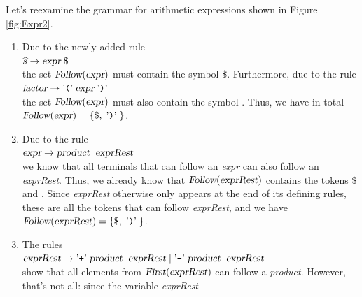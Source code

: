 \exampleEng
Let's reexamine the grammar for arithmetic expressions shown in Figure \ref{fig:Expr2}.
\begin{enumerate}
\item Due to the newly added rule
      \\[0.2cm]
      \hspace*{1.3cm}
      \(\widehat{s} \rightarrow \textsl{expr}\; \$\)
      \\[0.2cm]
      the set \(\textsl{Follow}(\textsl{expr})\) must contain the symbol \(\$\).
      Furthermore, due to the rule 
      \\[0.2cm]
      \hspace*{1.3cm}
      \(\textsl{factor} \rightarrow \mbox{'\texttt{(}'}\; \textsl{expr} \;\mbox{'\texttt{)}'}\)
      \\[0.2cm]
      the set \(\textsl{Follow}(\textsl{expr})\) must also contain the symbol \aquoted{)}.
      Thus, we have in total
      \\[0.2cm]
      \hspace*{1.3cm}
      \(\textsl{Follow}(\textsl{expr}) = \{ \$, \;\mbox{'\texttt{)}'}\; \}\).
\item Due to the rule 
      \\[0.2cm]
      \hspace*{1.3cm}
      \(\textsl{expr} \rightarrow \textsl{product}\;\;\textsl{exprRest}\)
      \\[0.2cm]      
      we know that all terminals that can follow an \textsl{expr} can also follow
      an \textsl{exprRest}. Thus, we already know that
      \(\textsl{Follow}(\textsl{exprRest})\) contains the tokens \(\$\) and \aquoted{)}.
      Since \textsl{exprRest} otherwise only appears at the end of its defining rules, these are all the tokens that can follow
      \textsl{exprRest}, and we have
      \\[0.2cm]
      \hspace*{1.3cm}
      \(\textsl{Follow}(\textsl{exprRest}) = \{ \$, \;\mbox{'\texttt{)}'}\; \}\).
\item The rules 
      \\[0.2cm]
      \hspace*{1.3cm}
      \(\textsl{exprRest} \rightarrow \mbox{'\texttt{+}'}\; \textsl{product}\;\;\textsl{exprRest} 
                         \mid        \mbox{'\texttt{-}'}\; \textsl{product}\;\;\textsl{exprRest}\)
      \\[0.2cm]
      show that all elements from \(\textsl{First}(\textsl{exprRest})\)
      can follow a \textsl{product}. However, that's not all: since the variable \textsl{exprRest}

\end{enumerate}
